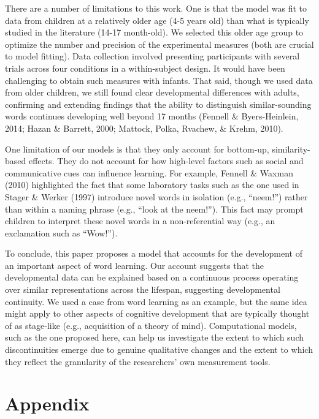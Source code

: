 \documentclass[english,,man]{apa6}
\begin{document}
There are a number of limitations to this work. One is that the model was fit to data from children at a relatively older age (4-5 years old) than what is typically studied in the literature (14-17 month-old). We selected this older age group to optimize the number and precision of the experimental measures (both are crucial to model fitting). Data collection involved presenting participants with several trials across four conditions in a within-subject design. It would have been challenging to obtain such measures with infants. That said, though we used data from older children, we still found clear developmental differences with adults, confirming and extending findings that the ability to distinguish similar-sounding words continues developing well beyond 17 months (Fennell \& Byers-Heinlein, 2014; Hazan \& Barrett, 2000; Mattock, Polka, Rvachew, \& Krehm, 2010).

One limitation of our models is that they only account for bottom-up, similarity-based effects. They do not account for how high-level factors such as social and communicative cues can influence learning. For example, Fennell \& Waxman (2010) highlighted the fact that some laboratory tasks such as the one used in Stager \& Werker (1997) introduce novel words in isolation (e.g., \enquote{neem!}) rather than within a naming phrase (e.g., \enquote{look at the neem!}). This fact may prompt children to interpret these novel words in a non-referential way (e.g., an exclamation such as \enquote{Wow!}).

To conclude, this paper proposes a model that accounts for the development of an important aspect of word learning. Our account suggests that the developmental data can be explained based on a continuous process operating over similar representations across the lifespan, suggesting developmental continuity. We used a case from word learning as an example, but the same idea might apply to other aspects of cognitive development that are typically thought of as stage-like (e.g., acquisition of a theory of mind). Computational models, such as the one proposed here, can help us investigate the extent to which such discontinuities emerge due to genuine qualitative changes and the extent to which they reflect the granularity of the researchers' own measurement tools.

\hypertarget{appendix}{%
\section{Appendix}\label{appendix}}
\end{document}
